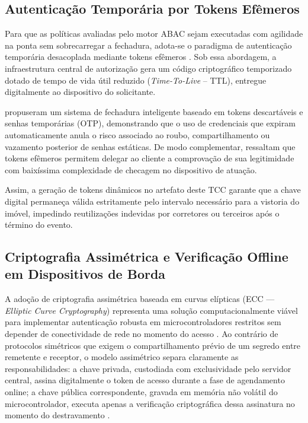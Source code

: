 \subsection{Autenticação Temporária por Tokens Efêmeros}
\label{subsec:tokens}

Para que as políticas avaliadas pelo motor ABAC sejam executadas com agilidade na ponta sem sobrecarregar a fechadura, adota-se o paradigma de autenticação temporária desacoplada mediante tokens efêmeros \cite{satanasaowapak2021}. Sob essa abordagem, a infraestrutura central de autorização gera um código criptográfico temporizado dotado de tempo de vida útil reduzido (\textit{Time-To-Live} -- TTL), entregue digitalmente ao dispositivo do solicitante.

 propuseram um sistema de fechadura inteligente baseado em tokens descartáveis e senhas temporárias (OTP), demonstrando que o uso de credenciais que expiram automaticamente anula o risco associado ao roubo, compartilhamento ou vazamento posterior de senhas estáticas. De modo complementar,  ressaltam que tokens efêmeros permitem delegar ao cliente a comprovação de sua legitimidade com baixíssima complexidade de checagem no dispositivo de atuação.

Assim, a geração de tokens dinâmicos no artefato deste TCC garante que a chave digital permaneça válida estritamente pelo intervalo necessário para a vistoria do imóvel, impedindo reutilizações indevidas por corretores ou terceiros após o término do evento.

\subsection{Criptografia Assimétrica e Verificação Offline em Dispositivos de Borda}
\label{subsec:criptografia-assimetrica}

A adoção de criptografia assimétrica baseada em curvas elípticas (ECC --- \textit{Elliptic Curve Cryptography}) representa uma solução computacionalmente viável para implementar autenticação robusta em microcontroladores restritos sem depender de conectividade de rede no momento do acesso \cite{hanblockchainoffline2018}. Ao contrário de protocolos simétricos que exigem o compartilhamento prévio de um segredo entre remetente e receptor, o modelo assimétrico separa claramente as responsabilidades: a chave privada, custodiada com exclusividade pelo servidor central, assina digitalmente o token de acesso durante a fase de agendamento online; a chave pública correspondente, gravada em memória não volátil do microcontrolador, executa apenas a verificação criptográfica dessa assinatura no momento do destravamento \cite{hanotmpp2l2020}.

